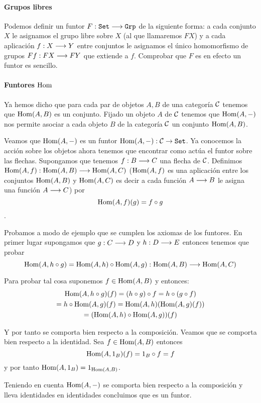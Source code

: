 \paragraph{Grupos libres}
Podemos definir un funtor $F : \texttt{Set}\longrightarrow \texttt{Grp}$ de la siguiente
forma: a cada conjunto $X$ le asignamos el grupo libre sobre $X$
(al que llamaremos $F X$) y a
cada aplicación $f : X\longrightarrow Y$ entre conjuntos le asignamos el
único homomorfismo de grupos $F f: F X\longrightarrow F Y$ que extiende a $f$.
Comprobar que
$F$ es en efecto un funtor es sencillo.

\paragraph{Funtores $\operatorname{Hom}$}
Ya hemos dicho que para cada par de objetos $A, B$ de
una categoría $\mathcal{C}$ tenemos que
$\operatorname{Hom}(A, B)$ es un conjunto. Fijado un objeto $A$ de
$\mathcal{C}$ tenemos que $\operatorname{Hom}(A, -)$ nos permite asociar a cada
objeto $B$ de la categoría $\mathcal{C}$ un conjunto $\operatorname{Hom}(A, B)$.

Veamos que $\operatorname{Hom}(A, -)$ es un funtor
$\operatorname{Hom}(A, -) : \mathcal{C} \rightarrow \texttt{Set}$. Ya conocemos la acción
sobre los objetos ahora tenemos que encontrar como actúa
el funtor sobre las flechas. Supongamos que tenemos
$f : B\longrightarrow C$ una flecha de $\mathcal{C}$. Definimos
$\operatorname{Hom}(A, f) : \operatorname{Hom}(A, B)\longrightarrow \operatorname{Hom}(A, C)$
($\operatorname{Hom}(A, f)$ es una aplicación entre los conjuntos
$\operatorname{Hom}(A, B)$ y $\operatorname{Hom}(A, C)$ es decir a cada función $A\longrightarrow B$
le asigna una función $A\longrightarrow C$) por
$$\operatorname{Hom}(A, f)(g) = f \circ g $$.

Probamos a modo de ejemplo
que se cumplen los axiomas de los funtores. En primer lugar
supongamos que $g : C\longrightarrow D$ y $h : D\longrightarrow E$ entonces tenemos
que probar
$$\operatorname{Hom}(A, h \circ g) = \operatorname{Hom}(A, h) \circ \operatorname{Hom}(A, g) :
\operatorname{Hom}(A, B)\longrightarrow \operatorname{Hom}(A, C)$$

Para probar tal cosa suponemos $f \in \operatorname{Hom}(A, B)$ y entonces:
\begin{multline*}
\operatorname{Hom}(A, h\circ g)(f) = (h \circ g) \circ f = h \circ (g \circ f) \\
= h \circ \operatorname{Hom}(A, g)(f) = \operatorname{Hom}(A, h)(\operatorname{Hom}(A, g)(f)) \\
= (\operatorname{Hom}(A, h) \circ \operatorname{Hom}(A, g))(f)
\end{multline*}

Y por tanto se comporta bien respecto a la composición. Veamos que se
comporta bien respecto a la identidad. Sea $f \in \operatorname{Hom}(A, B)$ entonces
$$\operatorname{Hom}(A, 1_B)(f) = 1_B \circ f = f$$ y por tanto
$\operatorname{Hom}(A, 1_B) = 1_{\operatorname{Hom}(A, B)}$.

Teniendo en cuenta $\operatorname{Hom}(A, -)$ se comporta bien respecto a la
composición y lleva identidades en identidades concluimos que es
un funtor.

